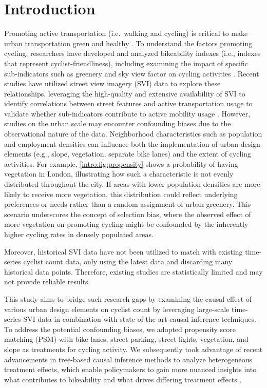 \documentclass[preprint,12pt, authoryear]{elsarticle}
\begin{document}
\section{Introduction} \label{sc:intro}
Promoting active transportation (i.e.\ walking and cycling) is critical to make urban transportation green and healthy \citep{neves_assessing_2019, cao_contribution_2019}. To understand the factors promoting cycling, researchers have developed and analyzed bikeability indexes (i.e., indexes that represent cyclist-friendliness), including examining the impact of specific sub-indicators such as greenery and sky view factor on cycling activities \citep{biljecki_street_2021a, fry_assessing_2020, mahabir_crowdsourcing_2020,2023_epb_semantic_networks}. Recent studies have utilized street view imagery (SVI) data to explore these relationships, leveraging the high-quality and extensive availability of SVI to identify correlations between street features and active transportation usage to validate whether sub-indicators contribute to active mobility usage \citep{yang_global_2020, nagata_objective_2020, wang_relationship_2020}. However, studies on the urban scale may encounter confounding biases due to the observational nature of the data. Neighborhood characteristics such as population and employment densities can influence both the implementation of urban design elements (e.g., slope, vegetation, separate bike lanes) and the extent of cycling activities.
For example, \autoref{intro:fig:propensity} shows a probability of having vegetation in London, illustrating how such a characteristic is not evenly distributed throughout the city. If areas with lower population densities are more likely to receive more vegetation, this distribution could reflect underlying preferences or needs rather than a random assignment of urban greenery. This scenario underscores the concept of selection bias, where the observed effect of more vegetation on promoting cycling might be confounded by the inherently higher cycling rates in densely populated areas.

Moreover, historical SVI data have not been utilized to match with existing time-series cyclist count data, only using the latest data and discarding many historical data points. Therefore, existing studies are statistically limited and may not provide reliable results.

This study aims to bridge such research gaps by examining the causal effect of various urban design elements on cyclist count by leveraging large-scale time-series SVI data in combination with state-of-the-art causal inference techniques. To address the potential confounding biases, we adopted propensity score matching (PSM) with bike lanes, street parking, street lights, vegetation, and slope as treatments for cycling activity. We subsequently took advantage of recent advancements in tree-based causal inference methods to analyze heterogeneous treatment effects, which enable policymakers to gain more nuanced insights into what contributes to bikeability and what drives differing treatment effects \citep{athey_generalized_2019}.
\end{document}
